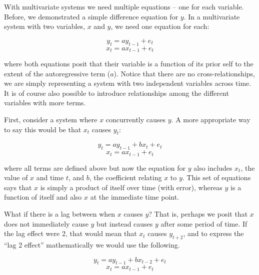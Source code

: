 \documentclass[english,,man]{apa6}
\theoremstyle{definition}
\theoremstyle{definition}
\theoremstyle{definition}
\theoremstyle{remark}
\begin{document}
With multivariate systems we need multiple equations -- one for each
variable. Before, we demonstrated a simple difference equation for
\(y\). In a multivariate system with two variables, \(x\) and \(y\), we
need one equation for each:

\begin{equation}
\label{sysy}
y_{t} = a y_{t - 1} + e_{t}
\end{equation} \begin{equation}
\label{sysx}
x_{t} = a x_{t - 1} + e_{t}
\end{equation}

\noindent where both equations posit that their variable is a function
of its prior self to the extent of the autoregressive term (\(a\)).
Notice that there are no cross-relationships, we are simply representing
a system with two independent variables across time. It is of course
also possible to introduce relationships among the different variables
with more terms.

First, consider a system where \(x\) concurrently causes \(y\). A more
appropriate way to say this would be that \(x_t\) causes \(y_t\):

\begin{equation}
\label{sysy2}
y_{t} = a y_{t - 1} + b x_{t} + e_{t}
\end{equation} \begin{equation}
\label{sysx2}
x_{t} = a x_{t - 1} + e_{t}
\end{equation}

\noindent where all terms are defined above but now the equation for
\(y\) also includes \(x_{t}\), the value of \(x\) and time \(t\), and
\(b\), the coefficient relating \(x\) to \(y\). This set of equations
says that \(x\) is simply a product of itself over time (with error),
whereas \(y\) is a function of itself and also \(x\) at the immediate
time point.

What if there is a lag between when \(x\) causes \(y\)? That is, perhaps
we posit that \(x\) does not immediately cause \(y\) but instead causes
\(y\) after some period of time. If the lag effect were 2, that would
mean that \(x_t\) causes \(y_{t + 2}\), and to express the \enquote{lag
2 effect} mathematically we would use the following.

\begin{equation}
\label{sysy3}
y_{t} = a y_{t - 1} + b x_{t - 2} + e_{t}
\end{equation} \begin{equation}
\label{sysx3}
x_{t} = a x_{t - 1} + e_{t}
\end{equation}
\end{document}
